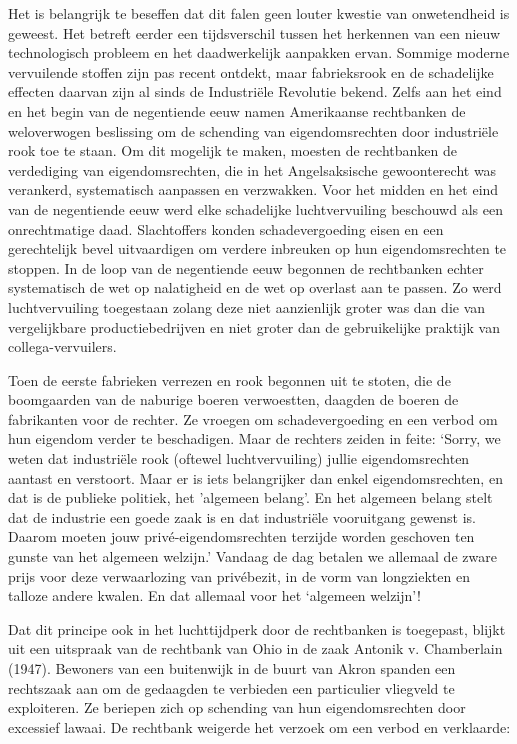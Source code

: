 \documentclass[
  a5paper,
  smalldemyvopaper,10pt,twoside,onecolumn,openright,extrafontsizes,hidelinks]{memoir}
\begin{document}
Het is belangrijk te beseffen dat dit falen geen louter kwestie van
onwetendheid is geweest. Het betreft eerder een tijdsverschil tussen het
herkennen van een nieuw technologisch probleem en het daadwerkelijk
aanpakken ervan. Sommige moderne vervuilende stoffen zijn pas recent
ontdekt, maar fabrieksrook en de schadelijke effecten daarvan zijn al
sinds de Industriële Revolutie bekend. Zelfs aan het eind en het begin
van de negentiende eeuw namen Amerikaanse rechtbanken de weloverwogen
beslissing om de schending van eigendomsrechten door industriële rook
toe te staan. Om dit mogelijk te maken, moesten de rechtbanken de
verdediging van eigendomsrechten, die in het Angelsaksische
gewoonterecht was verankerd, systematisch aanpassen en verzwakken. Voor
het midden en het eind van de negentiende eeuw werd elke schadelijke
luchtvervuiling beschouwd als een onrechtmatige daad. Slachtoffers
konden schadevergoeding eisen en een gerechtelijk bevel uitvaardigen om
verdere inbreuken op hun eigendomsrechten te stoppen. In de loop van de
negentiende eeuw begonnen de rechtbanken echter systematisch de wet op
nalatigheid en de wet op overlast aan te passen. Zo werd luchtvervuiling
toegestaan zolang deze niet aanzienlijk groter was dan die van
vergelijkbare productiebedrijven en niet groter dan de gebruikelijke
praktijk van collega-vervuilers.

Toen de eerste fabrieken verrezen en rook begonnen uit te stoten, die de
boomgaarden van de naburige boeren verwoestten, daagden de boeren de
fabrikanten voor de rechter. Ze vroegen om schadevergoeding en een
verbod om hun eigendom verder te beschadigen. Maar de rechters zeiden in
feite: `Sorry, we weten dat industriële rook (oftewel luchtvervuiling)
jullie eigendomsrechten aantast en verstoort. Maar er is iets
belangrijker dan enkel eigendomsrechten, en dat is de publieke politiek,
het 'algemeen belang'. En het algemeen belang stelt dat de industrie een
goede zaak is en dat industriële vooruitgang gewenst is. Daarom moeten
jouw privé-eigendomsrechten terzijde worden geschoven ten gunste van het
algemeen welzijn.' Vandaag de dag betalen we allemaal de zware prijs
voor deze verwaarlozing van privébezit, in de vorm van longziekten en
talloze andere kwalen. En dat allemaal voor het `algemeen welzijn'!

Dat dit principe ook in het luchttijdperk door de rechtbanken is
toegepast, blijkt uit een uitspraak van de rechtbank van Ohio in de zaak
Antonik v. Chamberlain (1947). Bewoners van een buitenwijk in de buurt
van Akron spanden een rechtszaak aan om de gedaagden te verbieden een
particulier vliegveld te exploiteren. Ze beriepen zich op schending van
hun eigendomsrechten door excessief lawaai. De rechtbank weigerde het
verzoek om een verbod en verklaarde:
\end{document}
